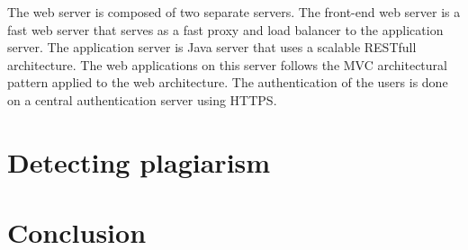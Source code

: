 \documentclass{article}
\begin{document}
The web server is composed of two separate servers. The front-end web server is
a fast web server that serves as a fast proxy and load balancer to the
application server. The application server is Java server that uses a scalable
RESTfull architecture. The web applications on this server follows the MVC
architectural pattern applied to the web architecture.
The authentication of the users is done on a central authentication server using
HTTPS. 

\section{Detecting plagiarism}

\section{Conclusion}




\end{document}
